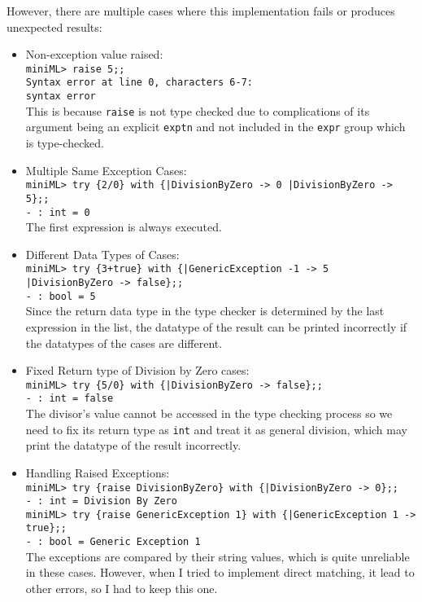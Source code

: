 \documentclass{article}
\begin{document}
    However, there are multiple cases where this implementation fails or produces unexpected results:
    \begin{itemize}
        \item Non-exception value raised:\\\texttt{miniML> raise 5;;\\Syntax error at line 0, characters 6-7:\\syntax error}\\This is because \texttt{raise} is not type checked due to complications of its argument being an explicit \texttt{exptn} and not included in the \texttt{expr} group which is type-checked.
        \item Multiple Same Exception Cases:\\\texttt{miniML> try \{2/0\} with \{|DivisionByZero -> 0 |DivisionByZero -> 5\};;\\- : int = 0}\\The first expression is always executed.
        \item Different Data Types of Cases:\\\texttt{miniML> try \{3+true\} with \{|GenericException -1 -> 5 |DivisionByZero -> false\};;\\- : bool = 5}\\Since the return data type in the type checker is determined by the last expression in the list, the datatype of the result can be printed incorrectly if the datatypes of the cases are different.
        \item Fixed Return type of Division by Zero cases:\\\texttt{miniML> try \{5/0\} with \{|DivisionByZero -> false\};;\\- : int = false}\\The divisor's value cannot be accessed in the type checking process so we need to fix its return type as \texttt{int} and treat it as general division, which may print the datatype of the result incorrectly.
        \item Handling Raised Exceptions: \\\texttt{miniML> try \{raise DivisionByZero\} with \{|DivisionByZero -> 0\};;\\- : int = Division By Zero\\miniML> try \{raise GenericException 1\} with \{|GenericException 1 -> true\};;\\- : bool = Generic Exception 1}\\The exceptions are compared by their string values, which is quite unreliable in these cases. However, when I tried to implement direct matching, it lead to other errors, so I had to keep this one.
    \end{itemize}
\end{document}

